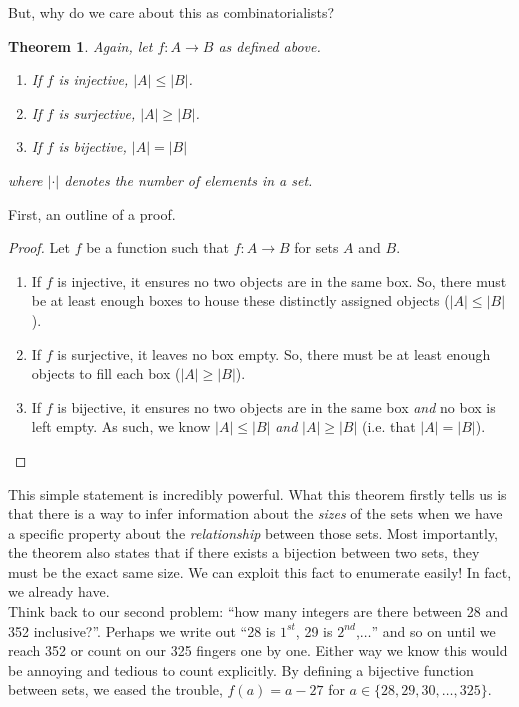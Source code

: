 \documentclass[openany]{book}
\newtheorem{thm}{Theorem}[section]
\theoremstyle{definition}
\begin{document}
But, why do we care about this as combinatorialists?
\begin{thm}\hfill

Again, let $f:A\to B$ as defined above.
    \begin{enumerate}\label{injsurjbij}
        \item If $f$ is injective, $|A|\leq |B|$.
        \item If $f$ is surjective, $|A|\geq |B|$.
        \item If $f$ is bijective, $|A|=|B|$
    \end{enumerate}
    where $|\cdot|$ denotes the number of elements in a set.
\end{thm}
First, an outline of a proof.
\begin{proof}\hfill

Let $f$ be a function such that $f:A\to B$ for sets $A$ and $B$.\\
    \begin{enumerate}
        \item If $f$ is injective, it ensures no two objects are in the same box. So, there must be at least enough boxes to house these distinctly assigned objects ($|A|\leq |B|$).
        \item If $f$ is surjective, it leaves no box empty. So, there must be at least enough objects to fill each box ($|A|\geq |B|$).
        \item If $f$ is bijective, it ensures no two objects are in the same box \emph{and} no box is left empty. As such, we know $|A|\leq |B|$ \emph{and} $|A|\geq |B|$ (i.e. that $|A|=|B|$).
    \end{enumerate}
\end{proof}
This simple statement is incredibly powerful. What this theorem firstly tells us is that there is a way to infer information about the \emph{sizes} of the sets when we have a specific property about the \emph{relationship} between those sets. Most importantly, the theorem also states that if there exists a bijection between two sets, they must be the exact same size. We can exploit this fact to enumerate easily! In fact, we already have.\\
Think back to our second problem: “how many integers are there between 28 and 352 inclusive?”. Perhaps we write out ``28 is $1^{st}$, 29 is $2^{nd}$,$\dots$'' and so on until we reach 352 or count on our 325 fingers one by one. Either way we know this would be annoying and tedious to count explicitly. By defining a bijective function between sets, we eased the trouble, $f(a)=a-27$ for $a\in \{28,29,30,\dots, 325\}$.\\
\end{document}
